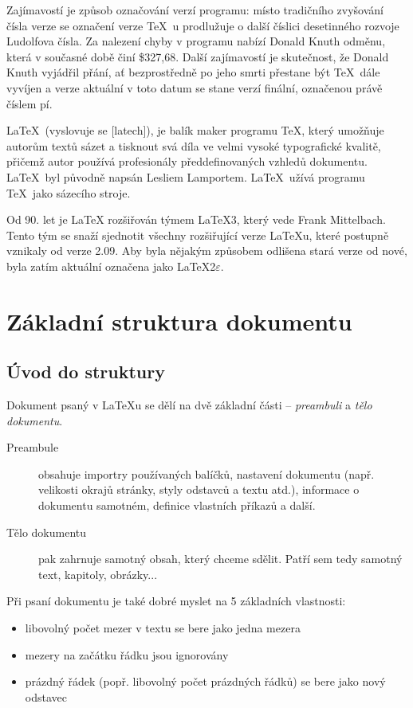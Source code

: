 \documentclass{article}
\begin{document}
Zajímavostí je způsob označování verzí programu: místo tradičního zvyšování čísla verze se označení verze \TeX\  u prodlužuje o další číslici desetinného rozvoje Ludolfova čísla. Za nalezení chyby v programu nabízí Donald Knuth odměnu, která v současné době činí \$327,68. Další zajímavostí je skutečnost, že Donald Knuth vyjádřil přání, ať bezprostředně po jeho smrti přestane být \TeX\  dále vyvíjen a verze aktuální v toto datum se stane verzí finální, označenou právě číslem pí.

\LaTeX\  (vyslovuje se [latech]), je balík maker programu \TeX, který umožňuje autorům textů sázet a tisknout svá díla ve velmi vysoké typografické kvalitě, přičemž autor používá profesionály předdefinovaných vzhledů dokumentu. \LaTeX\  byl původně napsán Lesliem Lamportem. \LaTeX\  užívá programu \TeX\  jako sázecího stroje.

Od 90. let je LaTeX rozšiřován týmem \LaTeX 3, který vede Frank Mittelbach. Tento tým se snaží sjednotit všechny rozšiřující verze \LaTeX u, které postupně vznikaly od verze 2.09. Aby byla nějakým způsobem odlišena stará verze od nové, byla zatím aktuální označena jako \LaTeX 2$\varepsilon$.

\clearpage

\section{Základní struktura dokumentu}
\subsection{Úvod do struktury}

Dokument psaný v \LaTeX u se dělí na dvě základní části -- \emph{preambuli} a \emph{tělo dokumentu}.

\begin{description}
\item[Preambule] obsahuje importry používaných balíčků, nastavení dokumentu (např. velikosti okrajů stránky, styly odstavců a textu atd.), informace o dokumentu samotném, definice vlastních příkazů a další.
\item[Tělo dokumentu] pak zahrnuje samotný obsah, který chceme sdělit. Patří sem tedy samotný text, kapitoly, obrázky...
\end{description}

\noindent Při psaní dokumentu je také dobré myslet na 5 základních vlastnosti:
\begin{itemize}
	\item libovolný počet mezer v textu se bere jako jedna mezera
	\item mezery na začátku řádku jsou ignorovány
	\item prázdný řádek (popř. libovolný počet prázdných řádků) se bere jako nový odstavec
\end{itemize}
\end{document}
